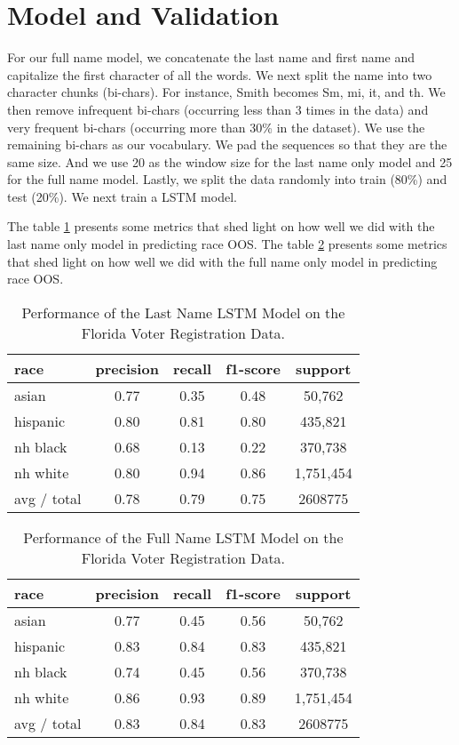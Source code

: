 \documentclass[12pt, letterpaper]{article}
\begin{document}
\section*{Model and Validation}
For our full name model, we concatenate the last name and first name and capitalize the first character of all the words. We next split the name into two character chunks (bi-chars). For instance, Smith becomes Sm, mi, it, and th. We then remove infrequent bi-chars (occurring less than 3 times in the data) and very frequent bi-chars (occurring more than 30\% in the dataset). We use the remaining bi-chars as our vocabulary. We pad the sequences so that they are the same size. And we use 20 as the window size for the last name only model and 25 for the full name model. Lastly, we split the data randomly into train (80\%) and test (20\%). We next train a LSTM model. 

The table \ref{table:2} presents some metrics that shed light on how well we did with the last name only model in predicting race OOS.  The table \ref{table:3} presents some metrics that shed light on how well we did with the full name only model in predicting race OOS.  

\begin{table}[h!]
\centering
\caption{Performance of the Last Name LSTM Model on the Florida Voter Registration Data.}
\begin{tabular}{ l c c c c }
\hline	
    race & precision & recall & f1-score & support \\
\hline
   asian & 0.77 & 0.35 & 0.48 & 50,762 \\
   hispanic &  0.80 & 0.81 & 0.80 & 435,821 \\
   nh black & 0.68 & 0.13 & 0.22 & 370,738 \\
   nh white & 0.80 & 0.94 & 0.86 & 1,751,454 \\
avg / total     &    0.78 & 0.79  &  0.75 & 2608775 \\
\hline
\end{tabular}
\label{table:2}
\end{table}

\begin{table}[h!]
\centering
\caption{Performance of the Full Name LSTM Model on the Florida Voter Registration Data.}
\begin{tabular}{ l c c c c }
\hline	
   race & precision & recall & f1-score & support\\
\hline
   asian & 0.77  & 0.45 & 0.56   &    50,762\\
   hispanic  &  0.83 & 0.84 & 0.83  &    435,821\\
   nh black &  0.74 &  0.45 & 0.56  &    370,738\\
   nh white  & 0.86  & 0.93 & 0.89  &   1,751,454\\

avg / total     &    0.83    &    0.84    &    0.83  &   2608775\\
\hline
\end{tabular}
\label{table:3}
\end{table}
\end{document}
